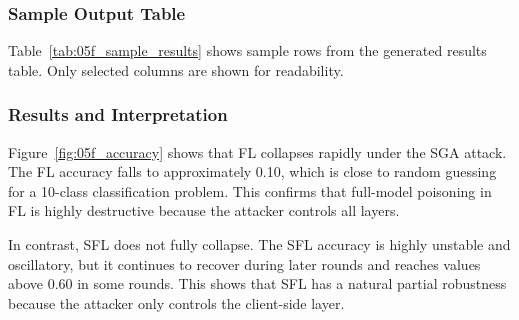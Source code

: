\subsubsection*{Sample Output Table}

Table~\ref{tab:05f_sample_results} shows sample rows from the generated results table. Only selected columns are shown for readability.

\begin{table}[H]
\centering
\caption{Sample diagnostic rows from File 05F SGA attack experiment.}
\label{tab:05f_sample_results}
\end{table}

\subsubsection*{Results and Interpretation}

Figure~\ref{fig:05f_accuracy} shows that FL collapses rapidly under the SGA attack. The FL accuracy falls to approximately 0.10, which is close to random guessing for a 10-class classification problem. This confirms that full-model poisoning in FL is highly destructive because the attacker controls all layers.

In contrast, SFL does not fully collapse. The SFL accuracy is highly unstable and oscillatory, but it continues to recover during later rounds and reaches values above 0.60 in some rounds. This shows that SFL has a natural partial robustness because the attacker only controls the client-side layer.

